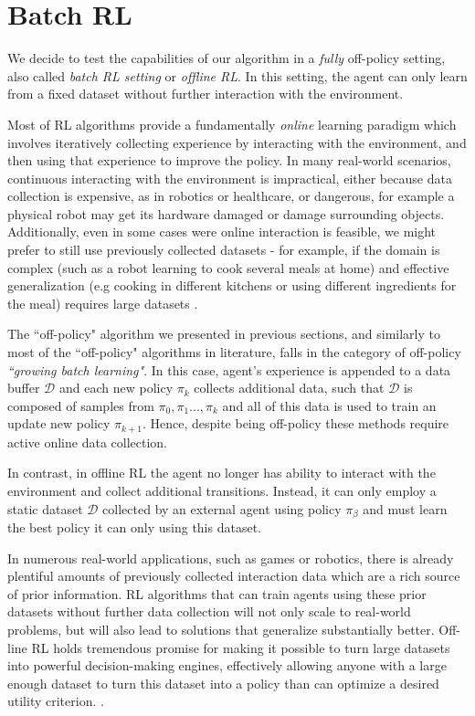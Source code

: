 \chapter{Batch RL}\label{chapter:batchrl}

We decide to test the capabilities of our algorithm in a \textit{fully} off-policy setting, 
also called \textit{batch RL setting} or \textit{offline RL}. In this setting, the agent 
can only learn from a fixed dataset without further interaction with the environment.

Most of RL algorithms provide a fundamentally \textit{online} learning paradigm which involves
iteratively collecting experience by interacting with the environment, and then
using that experience to improve the policy. 
In many  real-world scenarios, continuous interacting with the environment is impractical, either because 
data collection is expensive, as in robotics or healthcare, or dangerous, for example a physical robot may
get its hardware damaged or damage surrounding objects.
Additionally, even in some cases were online interaction is feasible, we might prefer to still use previously
collected datasets - for example, if the domain is complex (such as a robot learning to cook several meals at home)
and effective generalization (e.g cooking in different kitchens or using different ingredients for the meal)
requires large datasets \cite{levine2020}.


The ``off-policy" algorithm we presented in previous sections, and similarly to most of the ``off-policy"
algorithms in literature, falls in the category of 
off-policy \textit{``growing batch learning"}. In this case, agent's experience is appended to a data buffer 
$\mathcal{D}$ and each new policy $\pi_k$ collects additional data, such that $\mathcal{D}$
is composed of samples from $\pi_0,\pi_1...,\pi_k$ and all of this data is used to train an update new
policy $\pi_{k+1}$. 
Hence, despite being off-policy these methods require active online data collection.

In contrast, in offline RL the agent no longer has ability to interact with the environment and collect
additional transitions. Instead, it
can only employ a static dataset $\mathcal{D}$ collected by an external agent using policy $\pi_\beta$
and must learn the best policy it can only using this dataset.

In numerous real-world applications, such as games or robotics, there is already plentiful amounts 
of previously collected interaction data which are a rich source of prior information.
RL algorithms that can train agents using these prior datasets without further data collection
will not only scale to real-world problems, but will also lead to solutions that generalize substantially better.
Off-line RL holds tremendous promise for making it possible to turn large datasets into powerful 
decision-making engines, effectively allowing anyone with a large enough dataset to turn this dataset
into a policy than can optimize a desired utility criterion. \citep{levine2020}.


